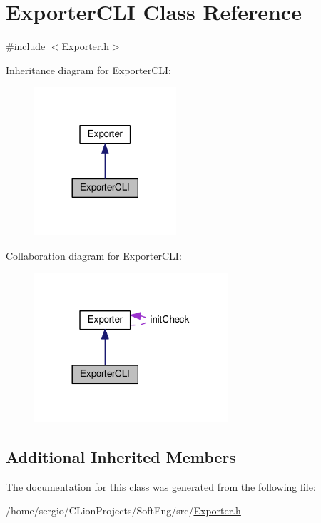 \hypertarget{class_exporter_c_l_i}{}\section{Exporter\+C\+LI Class Reference}
\label{class_exporter_c_l_i}


{\ttfamily \#include $<$Exporter.\+h$>$}



Inheritance diagram for Exporter\+C\+LI\+:\nopagebreak
\begin{figure}[H]
\begin{center}
\leavevmode
\includegraphics[width=149pt]{class_exporter_c_l_i__inherit__graph}
\end{center}
\end{figure}


Collaboration diagram for Exporter\+C\+LI\+:\nopagebreak
\begin{figure}[H]
\begin{center}
\leavevmode
\includegraphics[width=204pt]{class_exporter_c_l_i__coll__graph}
\end{center}
\end{figure}
\subsection*{Additional Inherited Members}


The documentation for this class was generated from the following file\+:\begin{DoxyCompactItemize}
\item 
/home/sergio/\+C\+Lion\+Projects/\+Soft\+Eng/src/\hyperlink{_exporter_8h}{Exporter.\+h}\end{DoxyCompactItemize}
